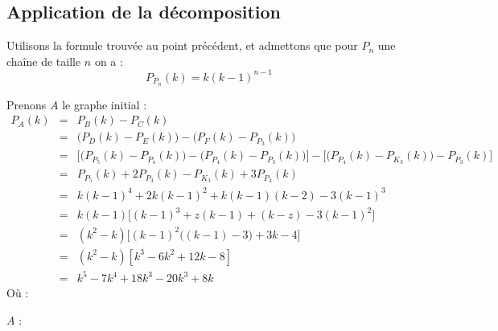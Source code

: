 \subsection{Application de la décomposition}
Utilisons la formule trouvée au point précédent, et admettons que pour $P_n$ une chaîne de taille $n$ on a :
\[ P_{P_n}(k) = k(k-1)^{n-1} \]

Prenons $A$ le graphe initial :
\begin{eqnarray*}
P_A(k) & = & P_B(k) - P_C(k) \\
&=& \big(P_D(k)-P_E(k)\big)-\big(P_F(k)-P_{P_3}(k)\big)\\
&=& \Big[\big(P_{P_5}(k)-P_{P_4}(k)\big)-\big(P_{P_4}(k)-P_{P_3}(k)\big)\Big]-\Big[\big(P_{P_4}(k)-P_{K_3}(k)\big)-P_{P_3}(k)\Big]\\
&=& P_{P_5}(k)+2P_{P_3}(k)-P_{K_3}(k)+3P_{P_4}(k)\\
&=& k(k-1)^4 +2k(k-1)^2+k(k-1)(k-2)-3(k-1)^3 \\
&=& k(k-1)\big[(k-1)^3+z(k-1)+(k-z)-3(k-1)^2\big]\\
&=& (k^2-k)\Big[(k-1)^2\big((k-1)-3\big)+3k -4 \Big]\\
&=& (k^2-k)[k^3-6k^2+12k-8]\\
&=& k^5-7k^4+18k^3-20k^3+8k
\end{eqnarray*}
Où :

$A$ : 

